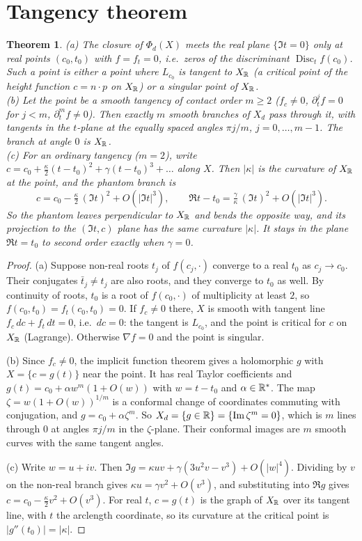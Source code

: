 \documentclass[11pt]{article}
\newtheorem{theorem}{Theorem}\newtheorem{proposition}[theorem]{Proposition}
\theoremstyle{definition}\newtheorem{definition}[theorem]{Definition}\newtheorem{remark}[theorem]{Remark}
\begin{document}
\section{Tangency theorem}
\begin{theorem}\label{thm:tangency}
(a) The closure of $\Phi_d(X)$ meets the real plane $\{\Im t=0\}$ only at real points $(c_0,t_0)$ with $f=f_t=0$, i.e.\ zeros of the discriminant $\operatorname{Disc}_t f(c_0)$. Such a point is either a point where $L_{c_0}$ is tangent to $X_{\mathbb{R}}$ (a critical point of the height function $c=n\cdot p$ on $X_{\mathbb{R}}$) or a singular point of $X_{\mathbb{R}}$.\\
(b) Let the point be a smooth tangency of contact order $m\ge2$ ($f_c\neq0$, $\partial_t^jf=0$ for $j<m$, $\partial_t^mf\neq0$). Then exactly $m$ smooth branches of $X_d$ pass through it, with tangents in the $t$-plane at the equally spaced angles $\pi j/m$, $j=0,\dots,m-1$. The branch at angle $0$ is $X_{\mathbb{R}}$.\\
(c) For an ordinary tangency ($m=2$), write $c=c_0+\frac{\kappa}{2}(t-t_0)^2+\gamma(t-t_0)^3+\dots$ along $X$. Then $|\kappa|$ is the curvature of $X_{\mathbb{R}}$ at the point, and the phantom branch is
\[ c=c_0-\tfrac{\kappa}{2}\,(\Im t)^2+O(|\Im t|^3),\qquad \Re t-t_0=\tfrac{\gamma}{\kappa}\,(\Im t)^2+O(|\Im t|^3). \]
So the phantom leaves perpendicular to $X_{\mathbb{R}}$ and bends the opposite way, and its projection to the $(\Im t,c)$ plane has the same curvature $|\kappa|$. It stays in the plane $\Re t=t_0$ to second order exactly when $\gamma=0$.
\end{theorem}
\begin{proof}
(a) Suppose non-real roots $t_j$ of $f(c_j,\cdot)$ converge to a real $t_0$ as $c_j\to c_0$. Their conjugates $\bar t_j\neq t_j$ are also roots, and they converge to $t_0$ as well. By continuity of roots, $t_0$ is a root of $f(c_0,\cdot)$ of multiplicity at least $2$, so $f(c_0,t_0)=f_t(c_0,t_0)=0$. If $f_c\neq0$ there, $X$ is smooth with tangent line $f_c\,dc+f_t\,dt=0$, i.e.\ $dc=0$: the tangent is $L_{c_0}$, and the point is critical for $c$ on $X_{\mathbb{R}}$ (Lagrange). Otherwise $\nabla f=0$ and the point is singular.

(b) Since $f_c\neq0$, the implicit function theorem gives a holomorphic $g$ with $X=\{c=g(t)\}$ near the point. It has real Taylor coefficients and $g(t)=c_0+\alpha w^m(1+O(w))$ with $w=t-t_0$ and $\alpha\in\mathbb{R}^*$. The map $\zeta=w(1+O(w))^{1/m}$ is a conformal change of coordinates commuting with conjugation, and $g=c_0+\alpha\zeta^m$. So $X_d=\{g\in\mathbb{R}\}=\{\operatorname{Im} \zeta^m=0\}$, which is $m$ lines through $0$ at angles $\pi j/m$ in the $\zeta$-plane. Their conformal images are $m$ smooth curves with the same tangent angles.

(c) Write $w=u+iv$. Then $\Im g=\kappa uv+\gamma(3u^2v-v^3)+O(|w|^4)$. Dividing by $v$ on the non-real branch gives $\kappa u=\gamma v^2+O(v^3)$, and substituting into $\Re g$ gives $c=c_0-\frac\kappa2v^2+O(v^3)$. For real $t$, $c=g(t)$ is the graph of $X_{\mathbb{R}}$ over its tangent line, with $t$ the arclength coordinate, so its curvature at the critical point is $|g''(t_0)|=|\kappa|$.
\end{proof}
\end{document}
